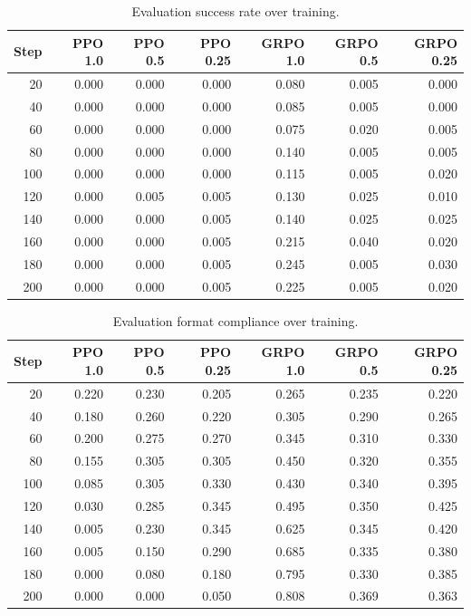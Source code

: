 \begin{table}[!htbp]
\centering
\small
\begin{tabular}{rrrrrrr}
\toprule
Step & PPO 1.0 & PPO 0.5 & PPO 0.25 & GRPO 1.0 & GRPO 0.5 & GRPO 0.25 \\
\midrule
20  & 0.000 & 0.000 & 0.000 & 0.080 & 0.005 & 0.000 \\
40  & 0.000 & 0.000 & 0.000 & 0.085 & 0.005 & 0.000 \\
60  & 0.000 & 0.000 & 0.000 & 0.075 & 0.020 & 0.005 \\
80  & 0.000 & 0.000 & 0.000 & 0.140 & 0.005 & 0.005 \\
100 & 0.000 & 0.000 & 0.000 & 0.115 & 0.005 & 0.020 \\
120 & 0.000 & 0.005 & 0.005 & 0.130 & 0.025 & 0.010 \\
140 & 0.000 & 0.000 & 0.005 & 0.140 & 0.025 & 0.025 \\
160 & 0.000 & 0.000 & 0.005 & 0.215 & 0.040 & 0.020 \\
180 & 0.000 & 0.000 & 0.005 & 0.245 & 0.005 & 0.030 \\
200 & 0.000 & 0.000 & 0.005 & 0.225 & 0.005 & 0.020 \\
\bottomrule
\end{tabular}
\caption{Evaluation success rate over training.}
\label{tab:app_success}
\end{table}

\begin{table}[!htbp]
\centering
\small
\begin{tabular}{rrrrrrr}
\toprule
Step & PPO 1.0 & PPO 0.5 & PPO 0.25 & GRPO 1.0 & GRPO 0.5 & GRPO 0.25 \\
\midrule
20  & 0.220 & 0.230 & 0.205 & 0.265 & 0.235 & 0.220 \\
40  & 0.180 & 0.260 & 0.220 & 0.305 & 0.290 & 0.265 \\
60  & 0.200 & 0.275 & 0.270 & 0.345 & 0.310 & 0.330 \\
80  & 0.155 & 0.305 & 0.305 & 0.450 & 0.320 & 0.355 \\
100 & 0.085 & 0.305 & 0.330 & 0.430 & 0.340 & 0.395 \\
120 & 0.030 & 0.285 & 0.345 & 0.495 & 0.350 & 0.425 \\
140 & 0.005 & 0.230 & 0.345 & 0.625 & 0.345 & 0.420 \\
160 & 0.005 & 0.150 & 0.290 & 0.685 & 0.335 & 0.380 \\
180 & 0.000 & 0.080 & 0.180 & 0.795 & 0.330 & 0.385 \\
200 & 0.000 & 0.000 & 0.050 & 0.808 & 0.369 & 0.363 \\
\bottomrule
\end{tabular}
\caption{Evaluation format compliance over training.}
\label{tab:app_format}
\end{table}

